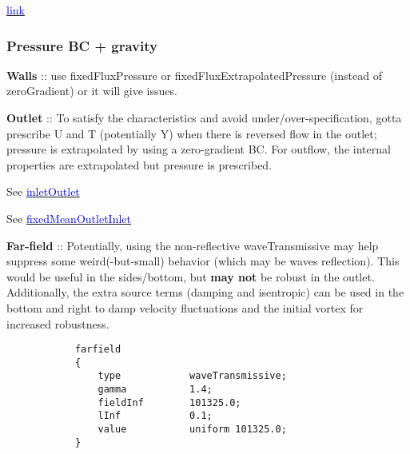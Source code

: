 \documentclass[a4paper, 12pt]{article}
\numberwithin{equation}{section}
\newcommand{\code}{\fontfamily{pcr}\selectfont}
\newcommand{\blue}[1]{\textcolor{blue}{#1}}
\begin{document}
            \href{
            https://www.cfd-online.com/Forums/openfoam-solving/119239-using-codedfixedvalue-apply-totalpressure-boundary-condition.html
            }{\blue{link}}

        \subsubsection{Pressure BC + gravity}

            \textbf{Walls} :: use {\code fixedFluxPressure} or {\code fixedFluxExtrapolatedPressure} (instead of {\code zeroGradient}) or it will give issues.


            \textbf{Outlet} :: To satisfy the characteristics and avoid under/over-specification, gotta prescribe U and T (potentially Y) when there is reversed flow in the outlet; pressure is extrapolated by using a zero-gradient BC. For outflow, the internal properties are extrapolated but pressure is prescribed.

            See \href{
            https://doc.openfoam.com/2306/tools/processing/boundary-conditions/rtm/derived/inletOutlet/inletOutlet/
            }{\blue{inletOutlet}}

            See \href{
            https://doc.openfoam.com/2306/tools/processing/boundary-conditions/rtm/derived/inletOutlet/fixedMeanOutletInlet/
            }{\blue{fixedMeanOutletInlet}}

            \textbf{Far-field} :: Potentially, using the non-reflective {\code waveTransmissive} may help suppress some weird(-but-small) behavior (which may be waves reflection). This would be useful in the sides/bottom, but \textbf{may not} be robust in the outlet. Additionally, the extra source terms (damping and isentropic) can be used in the bottom and right to damp velocity fluctuations and the initial vortex for increased robustness.

            {
            \begin{verbatim}
            farfield
            {
                type            waveTransmissive;
                gamma           1.4;
                fieldInf        101325.0;
                lInf            0.1;
                value           uniform 101325.0;
            }
            \end{verbatim}
            }
\end{document}
